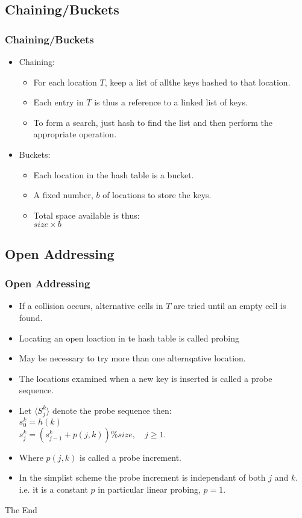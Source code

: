 \documentclass{beamer}
\begin{document}
\subsection{Chaining/Buckets}
\begin{frame}
\frametitle{Chaining/Buckets}
\begin{itemize}
\item Chaining:
\begin{itemize}
\item For each location $T$, keep a {\color{red} list} of allthe keys hashed to that location.
\item Each entry in $T$ is thus a reference to a linked list of keys.
\item To form a search, just hash to find the list and then perform the appropriate operation.
\end{itemize}
\item Buckets:
\begin{itemize}
\item Each location in the hash table is a bucket.
\item A fixed number, $b$ of locations to store the keys.
\item Total space available is thus:\\
$size \times b$
\end{itemize}
\end{itemize}
\end{frame}
\subsection{Open Addressing}
\begin{frame}
\frametitle{Open Addressing}
\begin{itemize}
\item If a collision occurs, alternative cells in $T$ are tried until an empty cell is found.
\item Locating an open loaction in te hash table is called {\color{green}probing} 
\item May be necessary to try more than one alternqative location.
\item The locations examined when a new key is inserted is called a {\color{purple}probe sequence}.
\item Let $\langle S_j^k\rangle$ denote the probe sequence then:\\
$s_0^k = h(k)$\\
$s_j^k = (s^k_{j-1} + p(j,k))\%size, \quad j \geq 1$.\\
\item Where $p(j,k)$ is called a {\color{red}probe increment}.
\item In the simplist scheme the probe increment is independant of both $j$ and $k$. i.e. it is a constant $p$ in particular {\color{magenta}linear probing}, $p=1$.
\end{itemize}
\end{frame}

\begin{frame} 
\Huge{\centerline{The End}}
\end{frame}
\end{document}
